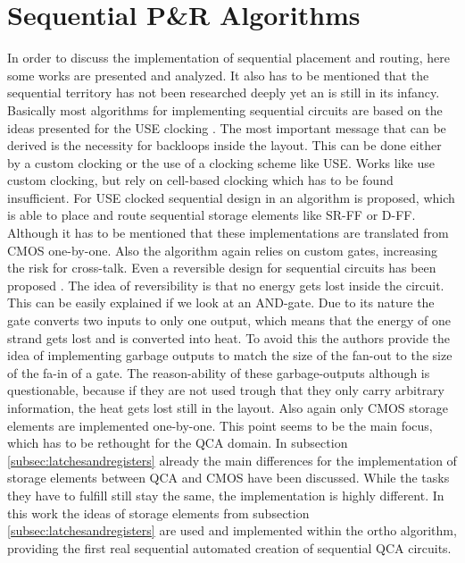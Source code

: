 \section{Sequential P\&R Algorithms}
In order to discuss the implementation of sequential placement and routing, here some works are presented and analyzed. It also has to be mentioned that the sequential territory has not been researched deeply yet an is still in its infancy. Basically most algorithms for implementing sequential circuits are based on the ideas presented for the USE clocking \cite{USE}. The most important message that can be derived is the necessity for backloops inside the layout. This can be done either by a custom clocking or the use of a clocking scheme like USE. Works like \cite{sequential_cell_one, sequential_cell_two} use custom clocking, but rely on cell-based clocking which has to be found insufficient. For USE clocked sequential design in \cite{sequential_tile_CMOS_one} an algorithm is proposed, which is able to place and route sequential storage elements like SR-FF or D-FF. Although it has to be mentioned that these implementations are translated from CMOS one-by-one. Also the algorithm again relies on custom gates, increasing the risk for cross-talk. Even a reversible design for sequential circuits has been proposed \cite{sequential_reversible}. The idea of reversibility is that no energy gets lost inside the circuit. This can be easily explained if we look at an AND-gate. Due to its nature the gate converts two inputs to only one output, which means that the energy of one strand gets lost and is converted into heat. To avoid this the authors provide the idea of implementing garbage outputs to match the size of the fan-out to the size of the fa-in of a gate. The reason-ability of these garbage-outputs although is questionable, because if they are not used trough that they only carry arbitrary information, the heat gets lost still in the layout. Also again only CMOS storage elements are implemented one-by-one. This point seems to be the main focus, which has to be rethought for the QCA domain. In subsection \ref{subsec:latchesandregisters} already the main differences for the implementation of storage elements between QCA and CMOS have been discussed. While the tasks they have to fulfill still stay the same, the implementation is highly different. In this work the ideas of storage elements from subsection \ref{subsec:latchesandregisters} are used and implemented within the ortho algorithm, providing the first real sequential automated creation of sequential QCA circuits.